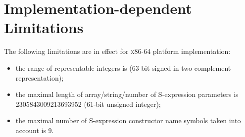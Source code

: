 \chapter{Implementation-dependent Limitations}
\label{sec:limitations}

The following limitations are in effect for \textsc{x86-64} platform implementation:

\begin{itemize}
\item the range of representable integers is \newline [-4611686018427387905..4611686018427387904] (63-bit signed in two-complement representation);
\item the maximal length of array/string/number of S-expression parameters is 2305843009213693952 (61-bit unsigned integer);
\item the maximal number of S-expression constructor name symbols taken into account is 9.
\end{itemize}
